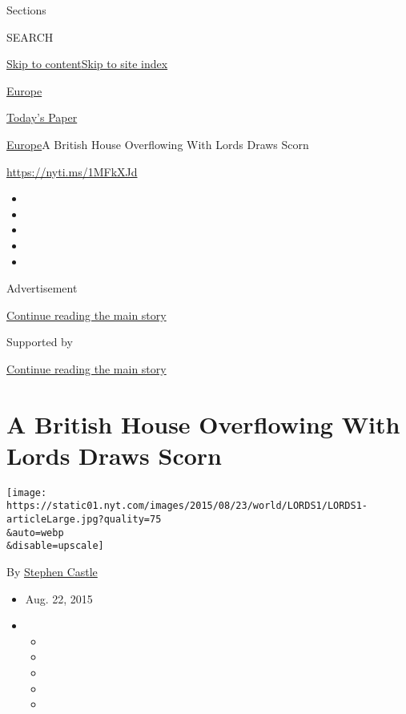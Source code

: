 Sections

SEARCH

\protect\hyperlink{site-content}{Skip to
content}\protect\hyperlink{site-index}{Skip to site index}

\href{https://www.nytimes.com/section/world/europe}{Europe}

\href{https://myaccount.nytimes.com/auth/login?response_type=cookie\&client_id=vi}{}

\href{https://www.nytimes.com/section/todayspaper}{Today's Paper}

\href{/section/world/europe}{Europe}\textbar{}A British House
Overflowing With Lords Draws Scorn

\url{https://nyti.ms/1MFkXJd}

\begin{itemize}
\item
\item
\item
\item
\item
\end{itemize}

Advertisement

\protect\hyperlink{after-top}{Continue reading the main story}

Supported by

\protect\hyperlink{after-sponsor}{Continue reading the main story}

\hypertarget{a-british-house-overflowing-with-lords-draws-scorn}{%
\section{A British House Overflowing With Lords Draws
Scorn}\label{a-british-house-overflowing-with-lords-draws-scorn}}

\texttt{[image: https://static01.nyt.com/images/2015/08/23/world/LORDS1/LORDS1-articleLarge.jpg?quality=75\\\&auto=webp\\\&disable=upscale]}

By \href{http://www.nytimes.com/by/stephen-castle}{Stephen Castle}

\begin{itemize}
\item
  Aug. 22, 2015
\item
  \begin{itemize}
  \item
  \item
  \item
  \item
  \item
  \end{itemize}
\end{itemize}

